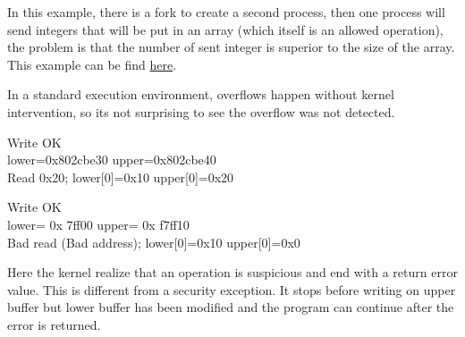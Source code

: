 \documentclass[a4paper, 11pt]{article}
\newcommand{\ptraddress}[1]{%
    0x\textcolor{gray}{\scalebox{0.9}{fffffff}}#1%
}
\begin{document}
		In this example, there is a fork to create a second process, then one process will send integers that will be put in an array (which itself is an allowed operation), the problem is that the number of sent integer is superior to the size of the array.
		This example can be find \href{https://ctsrd-cheri.github.io/cheri-exercises/exercises/cheriabi/index.html}{here}.
		\begin{center}
		\end{center}	
	
	
	
	
		In a standard execution environment, overflows happen without kernel intervention, so its not surprising to see the overflow was not detected.
		\begin{tcolorbox}[colback=gray!5!white, colframe=gray!75!black, title=Output on classic \Gls{risc-v} environment (No CHERI protection)]
			Write OK\\
			lower=0x802cbe30 upper=0x802cbe40\\
			Read 0x20; lower[0]=0x10 upper[0]=0x20
		\end{tcolorbox}
		\begin{tcolorbox}[colback=gray!5!white, colframe=blue!75!black, title=Output on CHERI protected environment]
			Write OK\\
			lower=\ptraddress{}7ff00 upper=\ptraddress{}f7ff10\\
			Bad read (Bad address); lower[0]=0x10 upper[0]=0x0
		\end{tcolorbox}
		Here the kernel realize that an operation is suspicious and end with a return error value. This is different from a security exception.
		It stops before writing on upper buffer but lower buffer has been modified and the program can continue after the error is returned.
	
\end{document}
